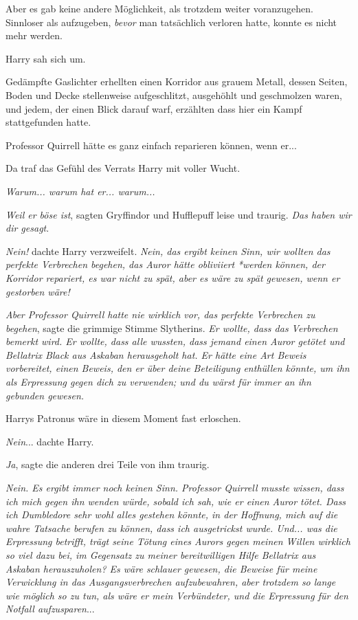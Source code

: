 {Aber es gab keine andere Möglichkeit, als trotzdem weiter voranzugehen. Sinnloser als aufzugeben, \emph{bevor} man tatsächlich verloren hatte, konnte es nicht mehr werden.

Harry sah sich um.

Gedämpfte Gaslichter erhellten einen Korridor aus grauem Metall, dessen Seiten, Boden und Decke stellenweise aufgeschlitzt, ausgehöhlt und geschmolzen waren, und jedem, der einen Blick darauf warf, erzählten dass hier ein Kampf stattgefunden hatte.

Professor Quirrell hätte es ganz einfach reparieren können, wenn er...

Da traf das Gefühl des Verrats Harry mit voller Wucht.

\emph{Warum... warum hat er... warum...}

\emph{Weil er böse ist}, sagten Gryffindor und Hufflepuff leise und traurig. \emph{Das haben wir dir gesagt}.

\emph{Nein!} dachte Harry verzweifelt. \emph{Nein, das ergibt keinen Sinn, wir wollten das perfekte Verbrechen begehen, das Auror hätte obliviiert} \emph{*werden können, der Korridor repariert, es war nicht zu spät, aber es wäre zu spät gewesen, wenn er gestorben wäre!}

\emph{Aber Professor Quirrell hatte nie wirklich vor, das perfekte Verbrechen zu begehen}, sagte die grimmige Stimme Slytherins. \emph{Er wollte, dass das Verbrechen bemerkt wird. Er wollte, dass alle wussten, dass jemand einen Auror getötet und Bellatrix Black aus Askaban herausgeholt hat. Er hätte eine Art Beweis vorbereitet, einen Beweis, den er über deine Beteiligung enthüllen könnte, um ihn als Erpressung gegen dich zu verwenden; und du wärst für immer an ihn gebunden gewesen.}

Harrys Patronus wäre in diesem Moment fast erloschen.

\emph{Nein}... dachte Harry.

\emph{Ja}, sagte die anderen drei Teile von ihm traurig.

\emph{Nein. Es ergibt immer noch keinen Sinn. Professor Quirrell musste wissen, dass ich mich gegen ihn wenden würde, sobald ich sah, wie er einen Auror tötet. Dass ich Dumbledore sehr wohl alles gestehen könnte, in der Hoffnung, mich auf die wahre Tatsache berufen zu können, dass ich ausgetrickst wurde. Und... was die Erpressung betrifft, trägt seine Tötung eines Aurors gegen meinen Willen wirklich so viel dazu bei, im Gegensatz zu meiner bereitwilligen Hilfe Bellatrix aus Askaban herauszuholen? Es wäre schlauer gewesen, die Beweise für meine Verwicklung in das Ausgangsverbrechen aufzubewahren, aber trotzdem so lange wie möglich so zu tun, als wäre er mein Verbündeter, und die Erpressung für den Notfall aufzusparen}...

}

